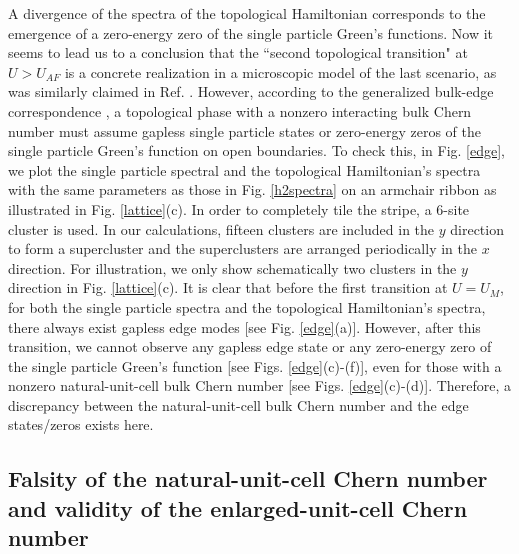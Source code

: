 \documentclass[12pt]{iopart}
\begin{document}
\par A divergence of the spectra of the topological Hamiltonian corresponds to the emergence of a zero-energy zero of the single particle Green's functions. Now it seems to lead us to a conclusion that the ``second topological transition" at $U>U_{AF}$ is a concrete realization in a microscopic model of the last scenario, as was similarly claimed in Ref. \cite{WFSM_PRB2016}. However, according to the generalized bulk-edge correspondence \cite{G_PRB2011,EG_PRB2011}, a topological phase with a nonzero interacting bulk Chern number must assume gapless single particle states or zero-energy zeros of the single particle Green's function on open boundaries. To check this, in Fig. \ref{edge}, we plot the single particle spectral and the topological Hamiltonian's spectra with the same parameters as those in Fig. \ref{h2spectra} on an armchair ribbon as illustrated in Fig. \ref{lattice}(c). In order to completely tile the stripe, a 6-site cluster is used. In our calculations, fifteen clusters are included in the $y$ direction to form a supercluster and the superclusters are arranged periodically in the $x$ direction. For illustration, we only show schematically two clusters in the $y$ direction in Fig. \ref{lattice}(c). It is clear that before the first transition at $U=U_M$, for both the single particle spectra and the topological Hamiltonian's spectra, there always exist gapless edge modes [see Fig. \ref{edge}(a)]. However, after this transition, we cannot observe any gapless edge state or any zero-energy zero of the single particle Green's function [see Figs. \ref{edge}(c)-(f)], even for those with a nonzero natural-unit-cell bulk Chern number [see Figs. \ref{edge}(c)-(d)]. Therefore, a discrepancy between the natural-unit-cell bulk Chern number and the edge states/zeros exists here.

\subsection{Falsity of the natural-unit-cell Chern number and validity of the enlarged-unit-cell Chern number}
\end{document}
